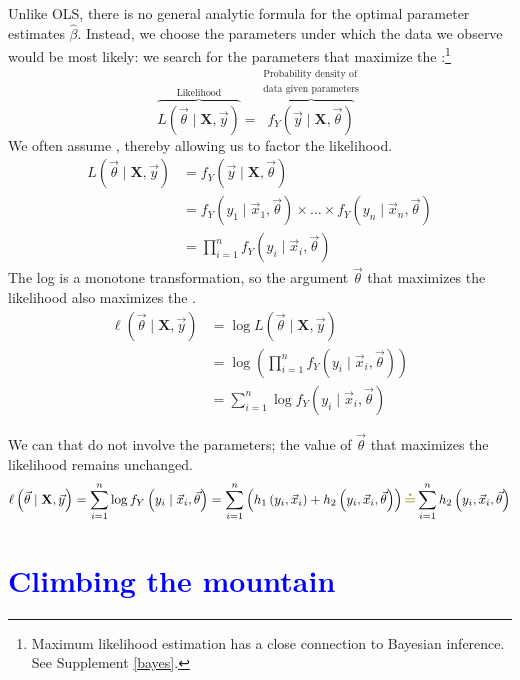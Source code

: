 \documentclass[11pt]{article}
\newcommand{\bblue}[1]{\textbf{\textcolor{blue}{#1}}}
\newcommand{\bgreen}[1]{\textbf{\color{olive}{#1}}}
\begin{document}
Unlike OLS, there is no general analytic formula for the optimal parameter estimates $\hat\beta$. Instead, we choose the parameters under which the data we observe would be most likely: we search for the parameters that maximize the \bgreen{likelihood}:\footnote{Maximum likelihood estimation has a close connection to Bayesian inference. See Supplement \ref{bayes}.}
$$\overbrace{L\left(\vec\theta\mid \mathbf{X},\vec{y}\right)}^\text{Likelihood} = \overbrace{f_Y\left(\vec{y}\mid \mathbf{X}, \vec\theta\right)}^{\substack{\text{Probability density of}\\\text{data given parameters}}}$$
We often assume \bgreen{conditional independence}, thereby allowing us to factor the likelihood.
$$\begin{aligned}
L\left(\vec\theta\mid \mathbf{X},\vec{y}\right) &= f_Y\left(\vec{y}\mid \mathbf{X}, \vec\theta\right) \\
 &= f_Y\left(y_1\mid \vec{x}_1, \vec\theta\right)\times \dots\times f_Y\left(y_n\mid \vec{x}_n, \vec\theta\right) \\
 &= \prod_{i=1}^n f_Y\left(y_i\mid \vec{x}_i, \vec\theta\right)
\end{aligned}$$
The log is a monotone transformation, so the argument $\vec\theta$ that maximizes the likelihood also maximizes the \bgreen{log likelihood}.
$$\begin{aligned}
\ell\left(\vec\theta\mid \mathbf{X},\vec{y}\right) &= \log L\left(\vec\theta\mid \mathbf{X},\vec{y}\right) \\
&= \log \left(\prod_{i=1}^n f_Y\left(y_i\mid \vec{x}_i, \vec\theta\right)\right) \\
&= \sum_{i=1}^n \log f_Y\left(y_i\mid \vec{x}_i, \vec\theta\right)
\end{aligned}$$


We can \bgreen{drop additive terms} that do not involve the parameters; the value of $\vec\theta$ that maximizes the likelihood remains unchanged.
$$\begin{aligned}
\ell\left(\vec\theta\mid \mathbf{X},\vec{y}\right) = \sum_{i=1}^n \log f_Y\left(y_i\mid \vec{x}_i, \vec\theta\right) = \sum_{i=1}^n \left(h_1\left(y_i,\vec{x}_i\right) + h_2\left(y_i,\vec{x}_i,\vec\theta\right) \right) {\color{olive}{\bm{\doteq}}} \sum_{i=1}^n h_2\left(y_i,\vec{x}_i,\vec\theta\right)
\end{aligned}$$

\section*{\bblue{Climbing the mountain}}
\end{document}
